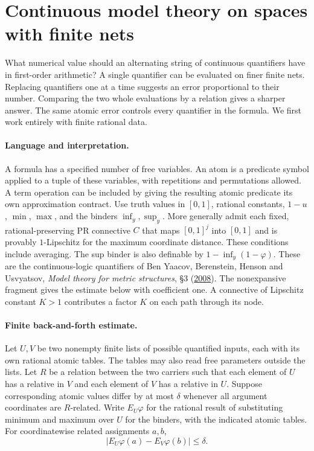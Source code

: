 \section{Continuous model theory on spaces with finite nets}
\label{sec:continuous-models}

What numerical value should an alternating string of continuous quantifiers
have in first-order arithmetic? A single quantifier can be evaluated on finer
finite nets. Replacing quantifiers one at a time suggests an error proportional
to their number. Comparing the two whole evaluations by a relation gives a
sharper answer. The same atomic error controls every quantifier in the
formula. We first work entirely with finite rational data.

\paragraph{Language and interpretation.}
A formula has a specified number of free variables. An atom is a predicate
symbol applied to a tuple of these variables, with repetitions and permutations
allowed. A term operation can be included by giving the resulting atomic
predicate its own approximation contract. Use truth values in $[0,1]$,
rational constants, $1-u$, $\min$, $\max$, and the binders
$\inf_y,\sup_y$. More generally admit each fixed, rational-preserving PR
connective $C$ that maps $[0,1]^j$ into $[0,1]$ and is provably
$1$-Lipschitz for the maximum coordinate distance. These conditions include
averaging. The sup binder is also definable by $1-\inf_y(1-\varphi)$.
These are the continuous-logic quantifiers of Ben Yaacov, Berenstein, Henson
and Usvyatsov, \emph{Model theory for metric structures}, \S3
(\href{https://doi.org/10.1017/CBO9780511735219.011}{2008}).
The nonexpansive fragment gives the estimate below with coefficient one.
A connective of Lipschitz constant $K>1$ contributes a factor $K$ on
each path through its node.

\paragraph{Finite back-and-forth estimate.}
Let $U,V$ be two nonempty finite lists of possible quantified inputs,
each with its own rational atomic tables. The tables may also read free
parameters outside the lists.
Let $R$ be a relation between the two carriers such that each element of
$U$ has a relative in $V$ and each element of $V$ has a relative in $U$.
Suppose corresponding atomic values differ by at most $\delta$ whenever
all argument coordinates are $R$-related. Write $E_U\varphi$ for the
rational result of substituting minimum and maximum over $U$ for the
binders, with the indicated atomic tables. For coordinatewise related
assignments $a,b$,
\begin{equation}
  |E_U\varphi(a)-E_V\varphi(b)|\leq \delta .
  \label{eq:model-transfer}
\end{equation}

